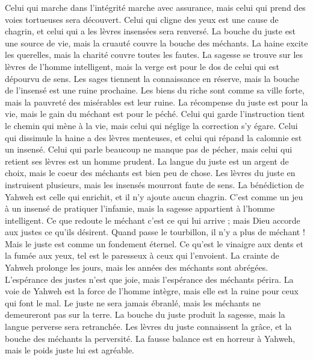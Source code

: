 \begin{multicols}{2}
Celui qui marche dans l'intégrité marche avec assurance, mais celui qui prend des voies tortueuses sera découvert.
Celui qui cligne des yeux est une cause de chagrin, et celui qui a les lèvres insensées sera renversé.
La bouche du juste est une source de vie, mais la cruauté couvre la bouche des méchants.
La haine excite les querelles, mais la charité couvre toutes les fautes.
La sagesse se trouve sur les lèvres de l'homme intelligent, mais la verge est pour le dos de celui qui est dépourvu de sens.
Les sages tiennent la connaissance en réserve, mais la bouche de l’insensé est une ruine prochaine.
Les biens du riche sont comme sa ville forte, mais la pauvreté des misérables est leur ruine.
La récompense du juste est pour la vie, mais le gain du méchant est pour le péché.
Celui qui garde l'instruction tient le chemin qui mène à la vie, mais celui qui néglige la correction s’y égare.
Celui qui dissimule la haine a des lèvres menteuses, et celui qui répand la calomnie est un insensé.
Celui qui parle beaucoup ne manque pas de pécher, mais celui qui retient ses lèvres est un homme prudent.
La langue du juste est un argent de choix, mais le coeur des méchants est bien peu de chose.
Les lèvres du juste en instruisent plusieurs, mais les insensés mourront faute de sens.
La bénédiction de Yahweh est celle qui enrichit, et il n'y ajoute aucun chagrin.
C'est comme un jeu à un insensé de pratiquer l’infamie, mais la sagesse appartient à l'homme intelligent.
Ce que redoute  le méchant c’est ce qui lui arrive ; mais Dieu accorde aux justes ce qu'ils désirent.
Quand passe le tourbillon, il n’y a plus de méchant ! Mais le juste est comme un fondement éternel.
Ce qu'est le vinaigre aux dents et la fumée aux yeux, tel est le paresseux à ceux qui l'envoient.
La crainte de Yahweh prolonge les jours, mais les années des méchants sont abrégées.
L'espérance des justes n'est que joie, mais l’espérance des méchants périra.
La voie de Yahweh est la force de l'homme intègre, mais elle est la ruine pour ceux qui font le mal.
Le juste ne sera jamais ébranlé, mais les méchants ne demeureront pas sur la terre.
La bouche du juste produit la sagesse, mais la langue perverse sera retranchée.
Les lèvres du juste connaissent la grâce, et la bouche des méchants la perversité.
\VerseOne{}La fausse balance est en horreur à Yahweh, mais le poids juste lui est agréable.

\end{multicols}
